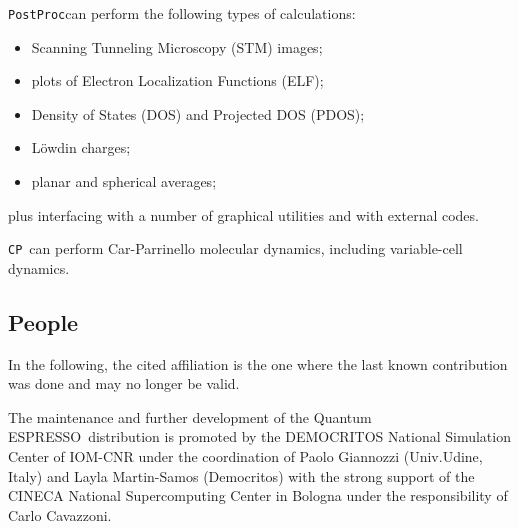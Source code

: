 \documentclass[12pt,a4paper]{article}
\def\qe{{\sc Quantum ESPRESSO}}
\def\CP{\texttt{CP}}
\def\PostProc{\texttt{PostProc}}
\begin{document}
\PostProc can perform the following types of calculations:
\begin{itemize}
  \item Scanning Tunneling Microscopy (STM) images;
  \item plots of Electron Localization Functions (ELF);
  \item Density of States (DOS) and Projected DOS (PDOS);
  \item L\"owdin charges;
  \item planar and spherical averages;
\end{itemize}
plus interfacing with a number of graphical utilities and with 
external codes.

\CP\ can perform Car-Parrinello molecular dynamics, including
variable-cell dynamics.

\subsection{People}

In the following, the cited affiliation is the one where the last known 
contribution was done and may no longer be valid.

The maintenance and further development of the \qe\ distribution
is promoted by the DEMOCRITOS National Simulation Center 
of IOM-CNR under the coordination of
Paolo Giannozzi (Univ.Udine, Italy) and Layla Martin-Samos 
(Democritos) with the strong support
of the CINECA National Supercomputing Center in Bologna under 
the responsibility of Carlo Cavazzoni.
\end{document}
